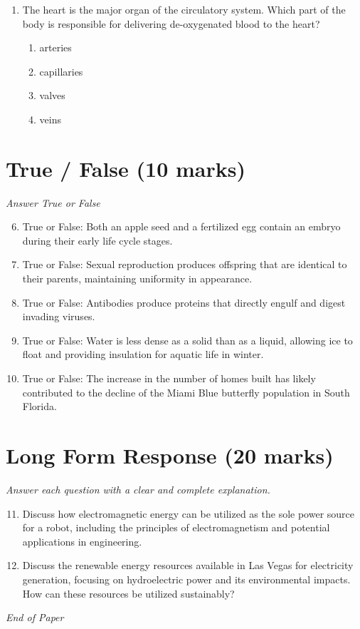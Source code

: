 \documentclass[12pt]{article}
\begin{document}
\begin{enumerate}[label=\arabic*.]
\begin{enumerate}[label=(\alph*)]
    \item increase number of windows
    \item increase thickness of insulation
\end{enumerate}
\item The heart is the major organ of the circulatory system. Which part of the body is responsible for delivering de-oxygenated blood to the heart?
\begin{enumerate}[label=(\alph*)]
    \item arteries
    \item capillaries
    \item valves
    \item veins
\end{enumerate}
\end{enumerate}

\section*{True / False (10 marks)}
\textit{Answer True or False}
\begin{enumerate}[label=\arabic*.]
\setcounter{enumi}{5}
\item True or False: Both an apple seed and a fertilized egg contain an embryo during their early life cycle stages.
\item True or False: Sexual reproduction produces offspring that are identical to their parents, maintaining uniformity in appearance.
\item True or False: Antibodies produce proteins that directly engulf and digest invading viruses.
\item True or False: Water is less dense as a solid than as a liquid, allowing ice to float and providing insulation for aquatic life in winter.
\item True or False: The increase in the number of homes built has likely contributed to the decline of the Miami Blue butterfly population in South Florida.
\end{enumerate}

\section*{Long Form Response (20 marks)}
\textit{Answer each question with a clear and complete explanation.}
\begin{enumerate}[label=\arabic*.]
\setcounter{enumi}{10}
\item Discuss how electromagnetic energy can be utilized as the sole power source for a robot, including the principles of electromagnetism and potential applications in engineering.
\item Discuss the renewable energy resources available in Las Vegas for electricity generation, focusing on hydroelectric power and its environmental impacts. How can these resources be utilized sustainably?
\end{enumerate}

\vfill
\noindent\textit{End of Paper}
\end{document}
